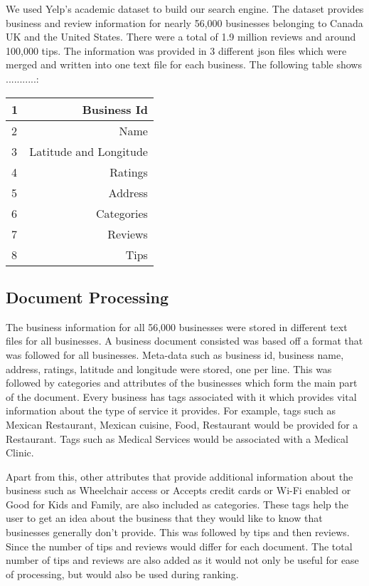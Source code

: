 \documentclass[paper=letter, fontsize=15pt]{article} %
\begin{document}
We used Yelp's academic dataset to build our search engine. The dataset provides business and review information for nearly 56,000 businesses belonging to Canada UK and the United States. There were a total of 1.9 million reviews and around 100,000 tips. The information was provided in 3 different json files which were merged and written into one text file for each business. The following table shows ...........:
\begin{center}
    \begin{tabular}{| l | r |}
    \hline
    1 & Business Id \\ \hline
    2 & Name  \\  \hline
    3 & Latitude and Longitude \\ \hline 
	4 & Ratings \\ \hline    
    5 & Address \\ \hline
    6 & Categories \\ \hline
    7 & Reviews \\ \hline
    8 & Tips \\ \hline
\end{tabular}
\end{center}
 
\subsection{Document Processing}
The business information for all 56,000 businesses were stored in different text files for all businesses. A business document consisted was based off a format that was followed for all businesses. Meta-data such as business id, business name, address, ratings, latitude and longitude were stored, one per line. This was followed by categories and attributes of the businesses which form the main part of the document.
Every business has tags associated with it which provides vital information about the type of service it provides. For example, tags such as Mexican Restaurant, Mexican cuisine, Food, Restaurant would be provided for a Restaurant. Tags such as Medical Services would be associated with a Medical Clinic.

Apart from this, other attributes that provide additional information about the business such as Wheelchair access or Accepts credit cards or Wi-Fi enabled or Good for Kids and Family, are also included as categories. These tags help the user to get an idea about the business that they would like to know that businesses generally don't provide.
This was followed by tips and then reviews. Since the number of tips and reviews would differ for each document. The total number of tips and reviews are also added as it would not only be useful for ease of processing, but would also be used during ranking.  
\end{document}
